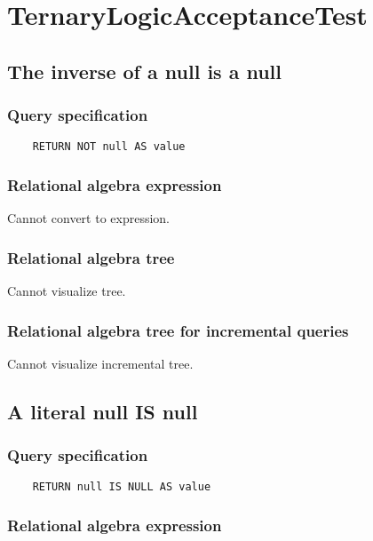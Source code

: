 	\section{TernaryLogicAcceptanceTest}

	\subsection{The inverse of a null is a null}

	\subsubsection*{Query specification}

	\begin{lstlisting}
	RETURN NOT null AS value
	\end{lstlisting}


	\subsubsection*{Relational algebra expression}

	Cannot convert to expression.

	\subsubsection*{Relational algebra tree}

	Cannot visualize tree.

	\subsubsection*{Relational algebra tree for incremental queries}

	Cannot visualize incremental tree.
	\subsection{A literal null IS null}

	\subsubsection*{Query specification}

	\begin{lstlisting}
	RETURN null IS NULL AS value
	\end{lstlisting}


	\subsubsection*{Relational algebra expression}

